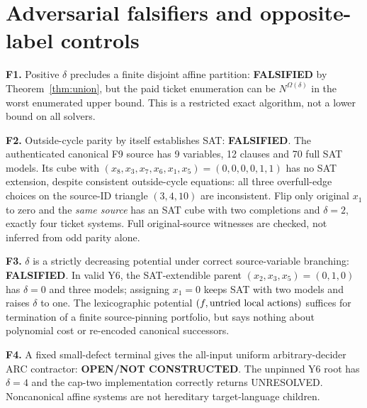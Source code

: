 \documentclass[11pt]{article}
\begin{document}
\section{Adversarial falsifiers and opposite-label controls}
\noindent\textbf{F1.} Positive $\delta$ precludes a finite disjoint affine partition: \textbf{FALSIFIED} by Theorem~\ref{thm:union}, but the paid ticket enumeration can be $N^{\Omega(\delta)}$ in the worst enumerated upper bound. This is a restricted exact algorithm, not a lower bound on all solvers.

\noindent\textbf{F2.} Outside-cycle parity by itself establishes SAT: \textbf{FALSIFIED}. The authenticated canonical F9 source has 9 variables, 12 clauses and 70 full SAT models. Its cube with $(x_8,x_3,x_7,x_6,x_1,x_5)=(0,0,0,0,1,1)$ has no SAT extension, despite consistent outside-cycle equations: all three overfull-edge choices on the source-ID triangle $(3,4,10)$ are inconsistent. Flip only original $x_1$ to zero and the \emph{same source} has an SAT cube with two completions and $\delta=2$, exactly four ticket systems. Full original-source witnesses are checked, not inferred from odd parity alone.

\noindent\textbf{F3.} $\delta$ is a strictly decreasing potential under correct source-variable branching: \textbf{FALSIFIED}. In valid Y6, the SAT-extendible parent $(x_2,x_3,x_5)=(0,1,0)$ has $\delta=0$ and three models; assigning $x_1=0$ keeps SAT with two models and raises $\delta$ to one. The lexicographic potential $(f,\hbox{untried local actions})$ suffices for termination of a finite source-pinning portfolio, but says nothing about polynomial cost or re-encoded canonical successors.

\noindent\textbf{F4.} A fixed small-defect terminal gives the all-input uniform arbitrary-decider ARC contractor: \textbf{OPEN/NOT CONSTRUCTED}. The unpinned Y6 root has $\delta=4$ and the cap-two implementation correctly returns UNRESOLVED. Noncanonical affine systems are not hereditary target-language children.
\end{document}
